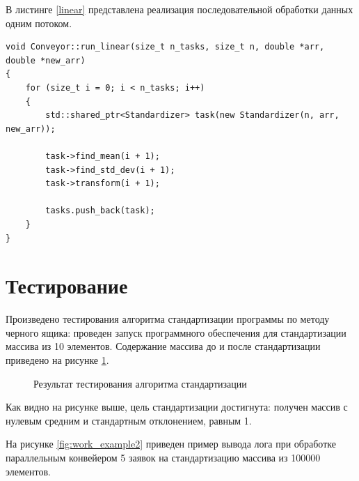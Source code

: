 \newpage
В листинге \ref{linear} представлена реализация последовательной обработки данных одним потоком.

\begin{lstlisting}[caption=Реализация последовательной обработки данных одним потоком,
	label={linear}]
void Conveyor::run_linear(size_t n_tasks, size_t n, double *arr, double *new_arr)
{
	for (size_t i = 0; i < n_tasks; i++)
	{
		std::shared_ptr<Standardizer> task(new Standardizer(n, arr, new_arr));
		
		task->find_mean(i + 1);
		task->find_std_dev(i + 1);
		task->transform(i + 1);
		
		tasks.push_back(task);
	}
}
\end{lstlisting}

\newpage
\section{Тестирование}

Произведено тестирования алгоритма стандартизации программы по методу черного ящика: проведен запуск программного обеспечения для стандартизации массива из 10 элементов. Содержание массива до и после стандартизации приведено на рисунке  \ref{fig:work_example}. 

\begin{figure}[h!]
	
	
	\caption{Результат тестирования алгоритма стандартизации}
	
	\label{fig:work_example}
	
\end{figure}

Как видно на рисунке выше, цель стандартизации достигнута: получен массив с нулевым средним и стандартным отклонением, равным 1.

\newpage
На рисунке \ref{fig:work_example2} приведен пример вывода лога при обработке параллельным конвейером 5 заявок на стандартизацию массива из 100000 элементов.


